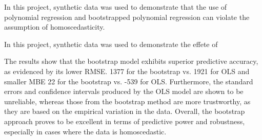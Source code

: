 In this project, synthetic data was used to demonstrate that the use of polynomial regression and bootstrapped polynomial regression can violate the assumption of homoscedasticity.

In this project, synthetic data was used to demonstrate the effete of 

 The results show that the bootstrap model exhibits superior predictive accuracy, as evidenced by its lower RMSE. 1377 for the bootstrap vs. 1921 for OLS and smaller MBE 22 for the bootstrap vs. -539 for OLS. Furthermore, the standard errors and confidence intervals produced by the OLS model are shown to be unreliable, whereas those from the bootstrap method are more trustworthy, as they are based on the empirical variation in the data. Overall, the bootstrap approach proves to be excellent in terms of predictive power and robustness, especially in cases where the data is homoscedastic.